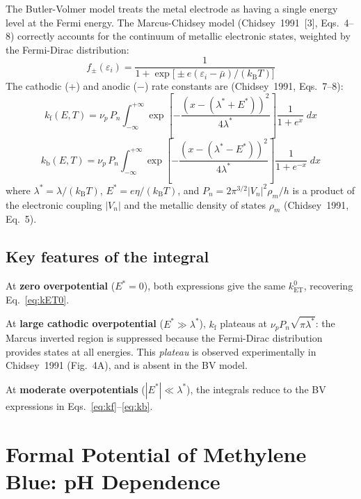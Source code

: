 \documentclass[10pt,a4paper]{article}
\numberwithin{equation}{section}
\newcommand{\kET}{k_{\text{ET}}^{0}}
\newcommand{\kf}{k_{\text{f}}}
\newcommand{\kb}{k_{\text{b}}}
\newcommand{\cit}[1]{[#1]}
\newcommand{\kB}{k_{\text{B}}}
\begin{document}
The Butler-Volmer model treats the metal electrode as having a single
energy level at the Fermi energy. The Marcus-Chidsey model
(Chidsey~1991~\cit{3}, Eqs.~4--8) correctly accounts for the
continuum of metallic electronic states, weighted by the
Fermi-Dirac distribution:
\begin{equation}
  f_{\pm}(\varepsilon_i) = \frac{1}{1 + \exp\!\bigl[\pm e(\varepsilon_i - \bar{\mu})/({\kB T})\bigr]}
  \label{eq:fermi}
\end{equation}
The cathodic ($+$) and anodic ($-$) rate constants are
(Chidsey~1991, Eqs.~7--8):
\begin{equation}
  \kf(E, T) = \nu_p\,P_n
  \int_{-\infty}^{+\infty}
  \exp\!\!\left[-\frac{(x - (\lambda^* + E^*))^2}{4\lambda^*}\right]
  \frac{1}{1+e^x}\;dx
  \label{eq:chidkf}
\end{equation}
\begin{equation}
  \kb(E, T) = \nu_p\,P_n
  \int_{-\infty}^{+\infty}
  \exp\!\!\left[-\frac{(x - (\lambda^* - E^*))^2}{4\lambda^*}\right]
  \frac{1}{1+e^{-x}}\;dx
  \label{eq:chidkb}
\end{equation}
where $\lambda^* = \lambda/(\kB T)$, $E^* = e\eta/(\kB T)$, and
$P_n = 2\pi^{3/2}|V_n|^2\rho_m/h$ is a product of the electronic
coupling $|V_n|$ and the metallic density of states $\rho_m$
(Chidsey~1991, Eq.~5).

\subsection{Key features of the integral}

At \textbf{zero overpotential} ($E^* = 0$), both expressions give the
same $\kET$, recovering Eq.~\eqref{eq:kET0}.

At \textbf{large cathodic overpotential} ($E^* \gg \lambda^*$),
$\kf$ plateaus at $\nu_p P_n \sqrt{\pi\lambda^*}$: the Marcus
inverted region is suppressed because the Fermi-Dirac distribution
provides states at all energies. This \textit{plateau} is observed
experimentally in Chidsey~1991 (Fig.~4A), and is absent in the BV
model.

At \textbf{moderate overpotentials} ($|E^*| \ll \lambda^*$), the
integrals reduce to the BV expressions in
Eqs.~\eqref{eq:kf}--\eqref{eq:kb}.

\section{Formal Potential of Methylene Blue: pH Dependence}
\label{sec:formal}
\end{document}
